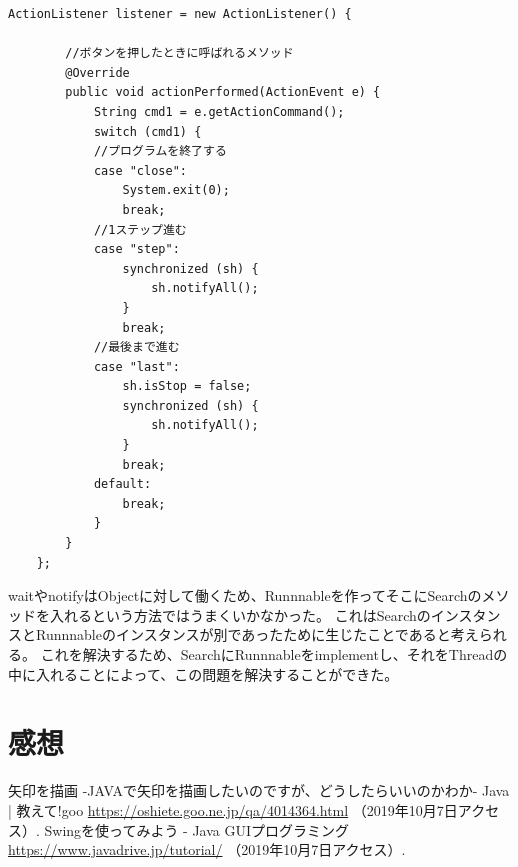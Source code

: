 ﻿\documentclass{jarticle}
\begin{document}
\begin{lstlisting}[caption=notify部分,label=src:notify]
    ActionListener listener = new ActionListener() {

        //ボタンを押したときに呼ばれるメソッド
        @Override
        public void actionPerformed(ActionEvent e) {
            String cmd1 = e.getActionCommand();
            switch (cmd1) {
            //プログラムを終了する
            case "close":
                System.exit(0);
                break;
            //1ステップ進む
            case "step":
                synchronized (sh) {
                    sh.notifyAll();
                }
                break;
            //最後まで進む
            case "last":
                sh.isStop = false;
                synchronized (sh) {
                    sh.notifyAll();
                }
                break;
            default:
                break;
            }
        }
    };
\end{lstlisting}

waitやnotifyはObjectに対して働くため、Runnnableを作ってそこにSearchのメソッドを入れるという方法ではうまくいかなかった。
これはSearchのインスタンスとRunnnableのインスタンスが別であったために生じたことであると考えられる。
これを解決するため、SearchにRunnnableをimplementし、それをThreadの中に入れることによって、この問題を解決することができた。

\section{感想}



\begin{thebibliography}{99}
 矢印を描画 -JAVAで矢印を描画したいのですが、どうしたらいいのかわか- Java | 教えて!goo
\url{https://oshiete.goo.ne.jp/qa/4014364.html} （2019年10月7日アクセス）.
 Swingを使ってみよう - Java GUIプログラミング
\url{https://www.javadrive.jp/tutorial/} （2019年10月7日アクセス）.


\end{thebibliography}
\end{document}
